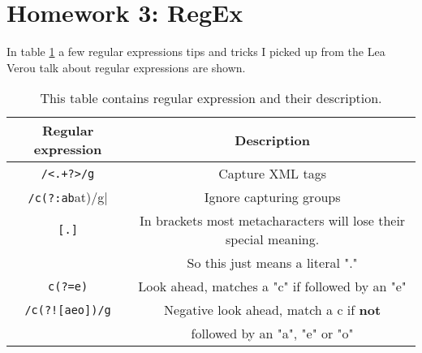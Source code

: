 \section[Homework 3]{Homework 3: RegEx}
In table \ref{table:regex} a few regular expressions tips and tricks I picked up from the Lea Verou talk about regular expressions are shown.

\begin{table}[h!]
	\begin{center}
		\begin{tabular}{ | c | c | }
		\hline
		\textbf{Regular expression} & \textbf{Description} \\
		\hline
		\verb|/<.+?>/g|&Capture XML tags\\ 
		\hline
		\verb|/c(?:ab|at)/g|&Ignore capturing groups\\ 
		\hline
		\verb|[.]|&In brackets most metacharacters will lose their special meaning.\\
		& So this just means a literal "."\\
		\hline
		\verb|c(?=e)| & Look ahead, matches a "c" if followed by an "e"\\
		\hline
		\verb|/c(?![aeo])/g| & Negative look ahead, match a c if \textbf{not} \\
		& followed by an "a", "e" or "o" \\
		\hline
		\end{tabular}
	\end{center}
	\caption{This table contains regular expression and their description.}
	\label{table:regex}
\end{table}
